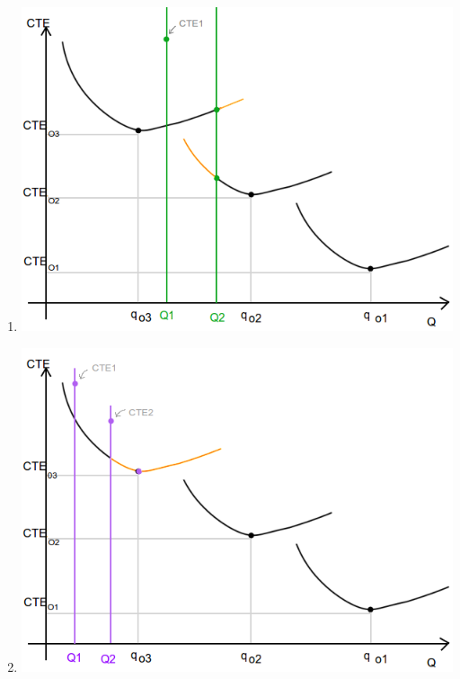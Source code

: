 \documentclass[a4paper,10pt]{article}
\begin{document}
\begin{enumerate}
 \item \includegraphics[scale=0.4,keepaspectratio=true]{img/7/7_QvsCTE_4B.png} 
 \item \includegraphics[scale=0.4,keepaspectratio=true]{img/7/7_QvsCTE_5B.png} 
\end{enumerate}
\end{document}
